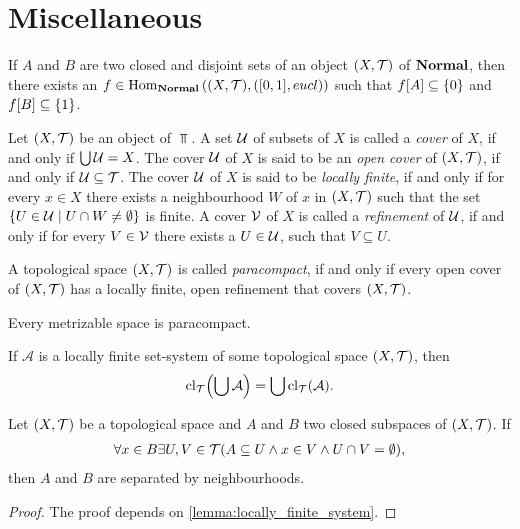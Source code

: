 \section{Miscellaneous}

\begin{lemma} \label{lemma:Urysohn} \cite[p. 445]{Ana1&2}
	If $A$ and $B$ are two closed and disjoint sets of an object $\tspace$ of $\Normal$, then there exists an $f \in \Hom_\Normal\pbraces{\tspace, \pbraces{[0,1], \eucl}}$ such that $f\bbraces{A} \subseteq \{0\}$ and $f\bbraces{B} \subseteq \{1\}$. 
\end{lemma}


\begin{definition}
	Let $\tspace$ be an object of $\Top$. A set $\cover$ of subsets of $X$ is called a \textit{cover} of $X$, if and only if $\bigcup \cover = X$. The cover $\cover$ of $X$ is said to be an \textit{open cover} of $\tspace$, if and only if $\cover \subseteq \mathcal{T}$. The cover $\cover$ of $X$ is said to be \textit{locally finite}, if and only if for every $x \in X$ there exists a neighbourhood $W$ of $x$ in $\tspace$ such that the set $\Bbraces{U \in \cover\mid U \cap W \neq \emptyset}$ is finite. A cover $\cover[V]$ of $X$ is called a \textit{refinement} of $\cover$, if and only if for every $V \in \cover[V]$ there exists a $U \in \cover$, such that $V \subseteq U$. 
\end{definition}

\begin{definition}
	A topological space $\tspace$ is called \textit{paracompact}, if and only if every open cover of $\tspace$ has a locally finite, open refinement that covers $\tspace$. 
\end{definition}

\begin{theorem}\label{theorem:stone}
	Every metrizable space is paracompact. \cite{Top}
\end{theorem}

\begin{lemma} \label{lemma:locally_finite_system} \cite[p. 63]{Top}
	If $\mathcal{A}$ is a locally finite set-system of some topological space $\tspace$, then
	\begin{align*}
		\cl{\bigcup \mathcal{A}} = \bigcup \cl{\mathcal{A}}.
	\end{align*}
\end{lemma}

\begin{lemma} \label{lemma:para_separation} \cite[p. 71]{Top}
	Let $\tspace$ be a topological space and $A$ and $B$ two closed subspaces of $\tspace$. If 
	\begin{align*}
		\forall x \in B\exists U, V \in \mathcal{T}\pbraces{A \subseteq U \land x \in V \land U \cap V = \emptyset},
	\end{align*}
	then $A$ and $B$ are separated by neighbourhoods. 
\end{lemma}
\begin{proof}
	The proof depends on \ref{lemma:locally_finite_system}.
\end{proof}

